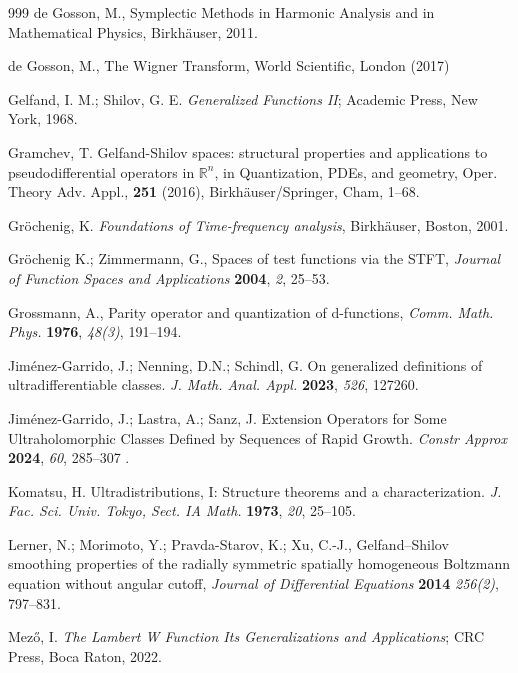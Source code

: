 \documentclass{article}
\theoremstyle{thmstyleone}
\theoremstyle{thmstyletwo}%
\theoremstyle{thmstylethree}%
\begin{document}
\begin{thebibliography}{999}
  de Gosson, M., Symplectic Methods in Harmonic Analysis and in Mathematical Physics, Birkh\"auser, 2011.


  de Gosson, M.,  The Wigner Transform, World Scientific, London (2017)


 Gelfand, I. M.; Shilov, G. E.
\textit{Generalized Functions II};
Academic Press, New York, 1968.


 Gramchev, T. Gelfand-Shilov spaces: structural properties and applications to pseudodifferential operators in
$\mathbb{R}^n$, in Quantization, PDEs, and geometry, Oper. Theory Adv. Appl., \textbf{251}  (2016), Birkh\"auser/Springer, Cham,  1--68.

 Gr{\"o}chenig, K.
\textit{Foundations of Time-frequency analysis}, Birkh\"auser, Boston, 2001.

 Gr{\"o}chenig K.; Zimmermann, G.,
Spaces of test functions via the STFT,
{\em Journal of Function Spaces and Applications}
{\bf 2004}, {\em  2}, 25--53.

 Grossmann, A.,
Parity operator and quantization of d-functions,
{\em Comm. Math. Phys.}  {\bf 1976}, {\em 48(3)}, 191--194.


 Jim\'enez-Garrido, J.; Nenning, D.N.; Schindl, G.
On generalized definitions of ultradifferentiable classes.
{\em J. Math. Anal. Appl.} {\bf 2023}, {\em 526}, 127260.

 Jim\'enez-Garrido, J.; Lastra, A.;  Sanz, J.
Extension Operators for Some Ultraholomorphic Classes Defined by Sequences of Rapid Growth. {\em  Constr Approx} {\bf 2024}, {\em 60}, 285--307 .

 Komatsu, H.
Ultradistributions, I: Structure theorems and a characterization.
{\em J. Fac. Sci. Univ. Tokyo, Sect. IA Math.} {\bf 1973}, {\em 20}, 25--105.


 Lerner, N.; Morimoto, Y.;  Pravda-Starov, K.;  Xu, C.-J.,
Gelfand--Shilov smoothing properties of the radially symmetric spatially
homogeneous Boltzmann equation without angular cutoff,
{\em Journal of Differential Equations} {\bf 2014} {\em 256(2)}, 
797--831.


 Mez\H{o}, I. 
\textit{The Lambert W Function Its Generalizations and Applications};
CRC Press, Boca Raton, 2022.


\end{thebibliography}
\end{document}
